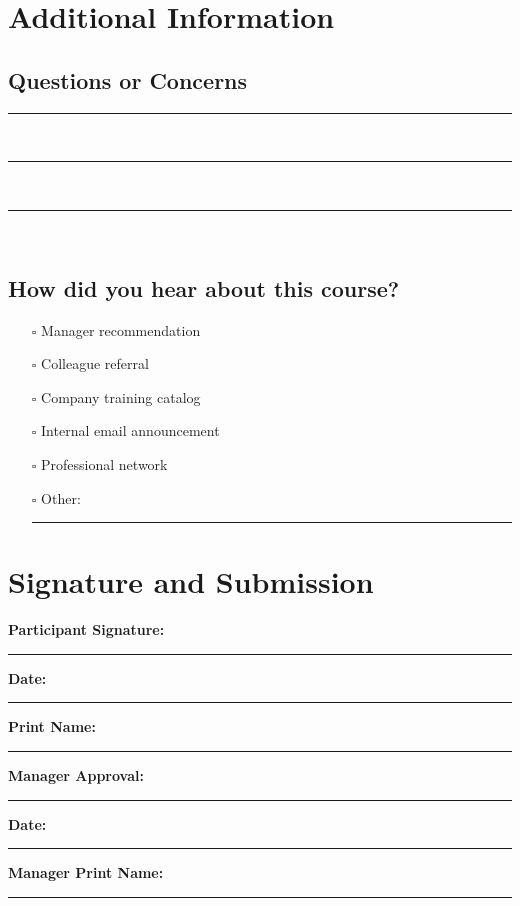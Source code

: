 \documentclass[11pt,a4paper]{article}
\begin{document}
\section{Additional Information}

\subsection{Questions or Concerns}
\rule{\textwidth}{0.4pt}\\[0.3cm]
\rule{\textwidth}{0.4pt}\\[0.3cm]
\rule{\textwidth}{0.4pt}\\[0.3cm]

\subsection{How did you hear about this course?}
\begin{itemize}[leftmargin=0.5cm]
    \item[$\square$] Manager recommendation
    \item[$\square$] Colleague referral
    \item[$\square$] Company training catalog
    \item[$\square$] Internal email announcement
    \item[$\square$] Professional network
    \item[$\square$] Other: \rule{4cm}{0.4pt}
\end{itemize}

\section{Signature and Submission}

\vspace{1cm}

\textbf{Participant Signature:} \rule{6cm}{0.4pt} \textbf{Date:} \rule{3cm}{0.4pt}

\vspace{0.5cm}

\textbf{Print Name:} \rule{6cm}{0.4pt}

\vspace{1cm}

\textbf{Manager Approval:} \rule{6cm}{0.4pt} \textbf{Date:} \rule{3cm}{0.4pt}

\vspace{0.5cm}

\textbf{Manager Print Name:} \rule{6cm}{0.4pt}
\end{document}
